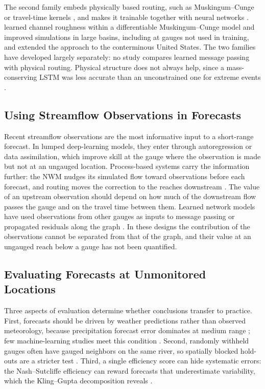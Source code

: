 \documentclass[draft]{agujournal2019}
\begin{document}
The second family embeds physically based routing, such as Muskingum--Cunge \cite{Cunge1969,David2011} or travel-time kernels \cite{Lohmann1996,Mizukami2016}, and makes it trainable together with neural networks \cite{Shen2023}.  learned channel roughness within a differentiable Muskingum--Cunge model and improved simulations in large basins, including at gauges not used in training, and  extended the approach to the conterminous United States. The two families have developed largely separately: no study compares learned message passing with physical routing. Physical structure does not always help, since a mass-conserving LSTM was less accurate than an unconstrained one for extreme events \cite{Frame2022,Hoedt2021}.

\subsection{Using Streamflow Observations in Forecasts}
\label{sec:obs}

Recent streamflow observations are the most informative input to a short-range forecast. In lumped deep-learning models, they enter through autoregression or data assimilation, which improve skill at the gauge where the observation is made \cite{Feng2020,Nearing2022} but not at an ungauged location. Process-based systems carry the information further: the NWM nudges its simulated flow toward observations before each forecast, and routing moves the correction to the reaches downstream \cite{Cosgrove2024}. The value of an upstream observation should depend on how much of the downstream flow passes the gauge and on the travel time between them. Learned network models have used observations from other gauges as inputs to message passing \cite{Kirschstein2024,WangH2025} or propagated residuals along the graph \cite{Sun2022}. In these designs the contribution of the observations cannot be separated from that of the graph, and their value at an ungauged reach below a gauge has not been quantified.

\subsection{Evaluating Forecasts at Unmonitored Locations}
\label{sec:attribution}

Three aspects of evaluation determine whether conclusions transfer to practice. First, forecasts should be driven by weather predictions rather than observed meteorology, because precipitation forecast error dominates at medium range \cite{Cloke2009,Wood2008}; few machine-learning studies meet this condition \cite{Nevo2022,Hunt2022,Nearing2024}. Second, randomly withheld gauges often have gauged neighbors on the same river, so spatially blocked hold-outs are a stricter test \cite{Roberts2017,Feng2021}. Third, a single efficiency score can hide systematic errors: the Nash--Sutcliffe efficiency \cite{Nash1970} can reward forecasts that underestimate variability, which the Kling--Gupta decomposition reveals \cite{Gupta2009}.
\end{document}
